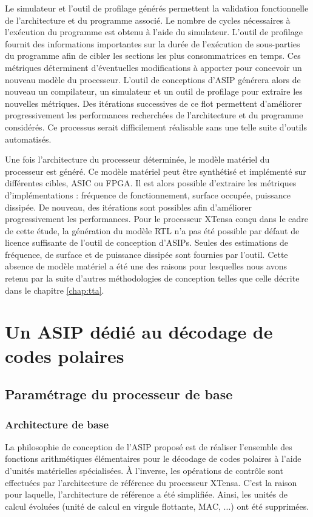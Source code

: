 Le simulateur et l'outil de profilage générés permettent la validation fonctionnelle de l'architecture et du programme associé. Le nombre de cycles nécessaires à l'exécution du programme est obtenu à l'aide du simulateur. L'outil de profilage fournit des informations importantes sur la durée de l'exécution de sous-parties du programme afin de cibler les sections les plus consommatrices en temps. Ces métriques déterminent d'éventuelles modifications à apporter pour concevoir un nouveau modèle du processeur. L'outil de conceptions d'ASIP générera alors de nouveau un compilateur, un simulateur et un outil de profilage pour extraire les nouvelles métriques. Des itérations successives de ce flot permettent d'améliorer progressivement les performances recherchées de l'architecture et du programme considérés. Ce processus serait difficilement réalisable sans une telle suite d'outils automatisés.

Une fois l'architecture du processeur déterminée, le modèle matériel du processeur est généré. Ce modèle matériel peut être synthétisé et implémenté sur différentes cibles, ASIC ou FPGA. Il est alors possible d'extraire les métriques d'implémentations : fréquence de fonctionnement, surface occupée, puissance dissipée. De nouveau, des itérations sont possibles afin d'améliorer progressivement les performances.
Pour le processeur XTensa conçu dans le cadre de cette étude, la génération du modèle RTL n'a pas été possible par défaut de licence suffisante de l'outil de conception d'ASIPs. Seules des estimations de fréquence, de surface et de puissance dissipée sont fournies par l'outil. Cette absence de modèle matériel a été une des raisons pour lesquelles nous avons retenu par la suite d'autres méthodologies de conception telles que celle décrite dans le chapitre \ref{chap:tta}.

\section{Un ASIP dédié au décodage de codes polaires}
\label{sec:tensilica_design}
\subsection{Paramétrage du processeur de base}
\subsubsection{Architecture de base}
La philosophie de conception de l'ASIP proposé est de réaliser l'ensemble des fonctions arithmétiques élémentaires pour le décodage de codes polaires à l'aide d'unités matérielles spécialisées. \`A l'inverse, les opérations de contrôle sont effectuées par l'architecture de référence du processeur XTensa. C'est la raison pour laquelle, l'architecture de référence a été simplifiée. Ainsi, les unités de calcul évoluées (unité de calcul en virgule flottante, MAC, ...) ont été supprimées.

